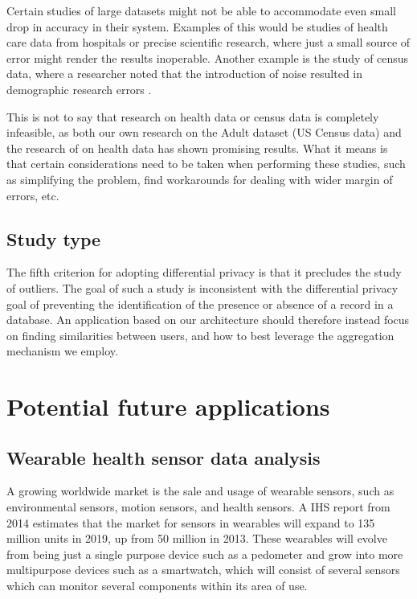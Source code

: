 Certain studies of large datasets might not be able to accommodate even small drop in accuracy in their system. Examples of this would be studies of health care data from hospitals or precise scientific research, where just a small source of error might render the results inoperable. Another example is the study of census data, where a researcher noted that the introduction of noise resulted in demographic research errors \citep{yakowitz2011tragedy}. 

This is not to say that research on health data or census data is completely infeasible, as both our own research on the Adult dataset (US Census data) and the research of \cite{ji2014DisLogReg} on health data has shown promising results. What it means is that certain considerations need to be taken when performing these studies, such as simplifying the problem, find workarounds for dealing with wider margin of errors, etc. 

\subsection{Study type}
The fifth criterion for adopting differential privacy is that it precludes the study of outliers. The goal of such a study is inconsistent with the differential privacy goal of preventing the identification of the presence or absence of a record in a database. An application based on our architecture should therefore instead focus on finding similarities between users, and how to best leverage the aggregation mechanism we employ. 


\section{Potential future applications}
\subsection{Wearable health sensor data analysis }
A growing worldwide market is the sale and usage of wearable sensors, such as environmental sensors, motion sensors, and health sensors. A IHS report \citep{ihs2014reportwearables} from 2014 estimates that the market for sensors in wearables will expand to 135 million units in 2019, up from 50 million in 2013. These wearables will evolve from being just a single purpose device such as a pedometer and grow into more multipurpose devices such as a smartwatch, which will consist of several sensors which can monitor several components within its area of use. 


